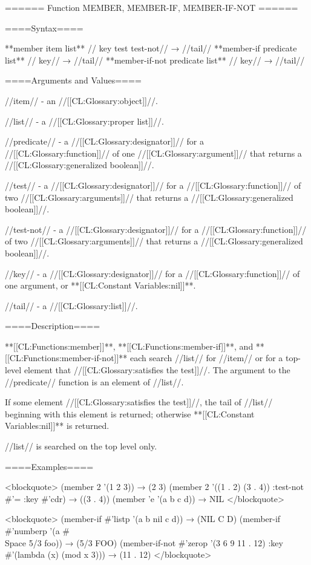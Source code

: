 ====== Function MEMBER, MEMBER-IF, MEMBER-IF-NOT ======

====Syntax====

**member {item list** //\key} key test test-not// → //tail// **member-if {predicate list** //\key} key// → //tail// **member-if-not {predicate list** //\key} key// → //tail//

====Arguments and Values====

//item// - an //[[CL:Glossary:object]]//.

//list// - a //[[CL:Glossary:proper list]]//.

//predicate// - a //[[CL:Glossary:designator]]// for a //[[CL:Glossary:function]]// of one //[[CL:Glossary:argument]]// that returns a //[[CL:Glossary:generalized boolean]]//.

//test// - a //[[CL:Glossary:designator]]// for a //[[CL:Glossary:function]]// of two //[[CL:Glossary:arguments]]// that returns a //[[CL:Glossary:generalized boolean]]//.

//test-not// - a //[[CL:Glossary:designator]]// for a //[[CL:Glossary:function]]// of two //[[CL:Glossary:arguments]]// that returns a //[[CL:Glossary:generalized boolean]]//.

//key// - a //[[CL:Glossary:designator]]// for a //[[CL:Glossary:function]]// of one argument, or **[[CL:Constant Variables:nil]]**.

//tail// - a //[[CL:Glossary:list]]//.

====Description====

**[[CL:Functions:member]]**, **[[CL:Functions:member-if]]**, and **[[CL:Functions:member-if-not]]** each search //list// for //item// or for a top-level element that //[[CL:Glossary:satisfies the test]]//. The argument to the //predicate// function is an element of //list//.

If some element //[[CL:Glossary:satisfies the test]]//, the tail of //list// beginning with this element is returned; otherwise **[[CL:Constant Variables:nil]]** is returned.

//list// is searched on the top level only.

====Examples====

<blockquote> (member 2 '(1 2 3)) → (2 3) (member 2 '((1 . 2) (3 . 4)) :test-not #'= :key #'cdr) → ((3 . 4)) (member 'e '(a b c d)) → NIL </blockquote>

<blockquote> (member-if #'listp '(a b nil c d)) → (NIL C D) (member-if #'numberp '(a #\\Space 5/3 foo)) → (5/3 FOO) (member-if-not #'zerop '(3 6 9 11 . 12) :key #'(lambda (x) (mod x 3))) → (11 . 12) </blockquote>

